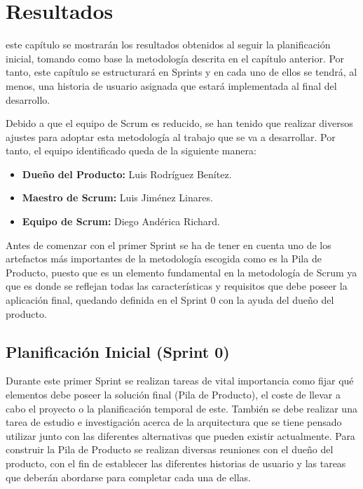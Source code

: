 \chapter{Resultados}
\label{chap:resultados}

 este capítulo se mostrarán los resultados obtenidos al seguir la planificación inicial, tomando como base la metodología descrita en el capítulo anterior. Por tanto, este capítulo se estructurará en Sprints y en cada uno de ellos se tendrá, al menos, una historia de usuario asignada que estará implementada al final del desarrollo.

Debido a que el equipo de Scrum es reducido, se han tenido que realizar diversos ajustes para adoptar esta metodología al trabajo que se va a desarrollar. Por tanto, el equipo identificado queda de la siguiente manera:

\begin{itemize}
	\item \textbf{Dueño del Producto:} Luis Rodríguez Benítez.
	\item \textbf{Maestro de Scrum:} Luis Jiménez Linares.
	\item \textbf{Equipo de Scrum:} Diego Andérica Richard.
\end{itemize}

Antes de comenzar con el primer Sprint se ha de tener en cuenta uno de los artefactos más importantes de la metodología escogida como es la Pila de Producto, puesto que es un elemento fundamental en la metodología de Scrum ya que es donde se reflejan todas las características y requisitos que debe poseer la aplicación final, quedando definida en el Sprint 0 con la ayuda del dueño del producto.

\clearpage

\section{Planificación Inicial (Sprint 0)}
Durante este primer Sprint se realizan tareas de vital importancia como fijar qué elementos debe poseer la solución final (Pila de Producto), el coste de llevar a cabo el proyecto o la planificación temporal de este. También se debe realizar una tarea de estudio e investigación acerca de la arquitectura que se tiene pensado utilizar junto con las diferentes alternativas que pueden existir actualmente. Para construir la Pila de Producto se realizan diversas reuniones con el dueño del producto, con el fin de establecer las diferentes historias de usuario y las tareas que deberán abordarse para completar cada una de ellas.

